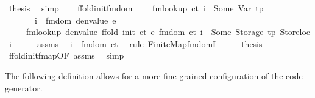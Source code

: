 \begin{isabellebody}
\ {\isacharquery}{\kern0pt}thesis\ \isamarkupfalse%
\ simp\isanewline
\ \ \isamarkupfalse%
\isanewline
{}\isamarkupfalse%
%
\endisatagproof
{\isafoldproof}%
%
\isadelimproof
\isanewline
%
\endisadelimproof
\isanewline
\isanewline
{}\isamarkupfalse%
\ ffold{\isacharunderscore}{\kern0pt}init{\isacharunderscore}{\kern0pt}fmdom{\isacharcolon}{\kern0pt}\ \isanewline
\ \ \ {\isachardoublequoteopen}fmlookup\ ct\ i\ {\isacharequal}{\kern0pt}\ Some\ {\isacharparenleft}{\kern0pt}Var\ tp{\isacharparenright}{\kern0pt}{\isachardoublequoteclose}\isanewline
\ \ \ \ \ \ \ {\isachardoublequoteopen}i\ {\isacharbar}{\kern0pt}{\isasymnotin}{\isacharbar}{\kern0pt}\ fmdom\ {\isacharparenleft}{\kern0pt}denvalue\ e{\isacharparenright}{\kern0pt}{\isachardoublequoteclose}\isanewline
\ \ \ \ \ {\isachardoublequoteopen}fmlookup\ {\isacharparenleft}{\kern0pt}denvalue\ {\isacharparenleft}{\kern0pt}ffold\ {\isacharparenleft}{\kern0pt}init\ ct{\isacharparenright}{\kern0pt}\ e\ {\isacharparenleft}{\kern0pt}fmdom\ ct{\isacharparenright}{\kern0pt}{\isacharparenright}{\kern0pt}{\isacharparenright}{\kern0pt}\ i\ {\isacharequal}{\kern0pt}\ Some\ {\isacharparenleft}{\kern0pt}Storage\ tp{\isacharcomma}{\kern0pt}\ Storeloc\ i{\isacharparenright}{\kern0pt}{\isachardoublequoteclose}\isanewline
%
\isadelimproof
%
\endisadelimproof
%
\isatagproof
{}\isamarkupfalse%
\ {\isacharminus}{\kern0pt}\isanewline
\ \ \isamarkupfalse%
\ assms{\isacharparenleft}{\kern0pt}{}{\isacharparenright}{\kern0pt}\ \isamarkupfalse%
\ {\isachardoublequoteopen}i\ {\isacharbar}{\kern0pt}{\isasymin}{\isacharbar}{\kern0pt}\ fmdom\ ct{\isachardoublequoteclose}\ \isamarkupfalse%
\ {\isacharparenleft}{\kern0pt}rule\ Finite{\isacharunderscore}{\kern0pt}Map{\isachardot}{\kern0pt}fmdomI{\isacharparenright}{\kern0pt}\isanewline
\ \ \isamarkupfalse%
\ \isamarkupfalse%
\ {\isacharquery}{\kern0pt}thesis\ \isamarkupfalse%
\ ffold{\isacharunderscore}{\kern0pt}init{\isacharunderscore}{\kern0pt}fmap{\isacharbrackleft}{\kern0pt}OF\ assms{\isacharbrackright}{\kern0pt}\ \isamarkupfalse%
\ simp\isanewline
{}\isamarkupfalse%
%
\endisatagproof
{\isafoldproof}%
%
\isadelimproof
%
\endisadelimproof
%
\begin{isamarkuptext}%
The following definition allows for a more fine-grained configuration of the 
     code generator.%
\end{isamarkuptext}\isamarkuptrue%

\end{isabellebody}
